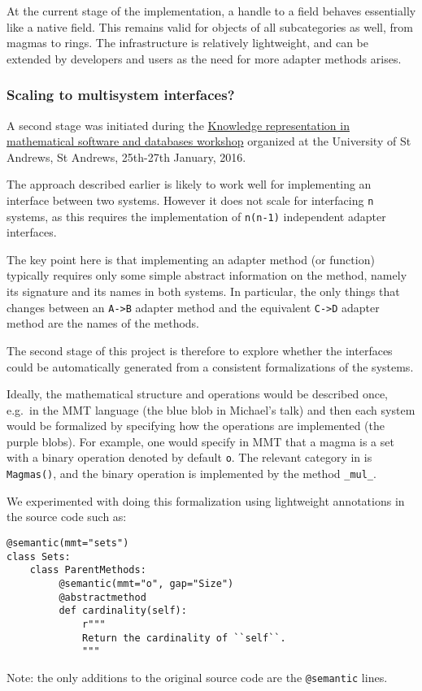 At the current stage of the implementation, a handle to a \GAP field
behaves essentially like a native \Sage field. This remains valid for
objects of all subcategories as well, from magmas to rings. The
infrastructure is relatively lightweight, and can be extended by
developers and users as the need for more adapter methods arises.

\subsubsection{Scaling to multisystem interfaces?}\label{scaling-to-multisystem-interfaces}

A second stage was initiated during the
\href{http://opendreamkit.org/2015/12/08/WP6StAndrewsMeeting/}{Knowledge
representation in mathematical software and databases workshop}
organized at the University of St Andrews, St Andrews, 25th-27th
January, 2016.

The approach described earlier is likely to work well for implementing
an interface between two systems. However it does not scale for
interfacing \texttt{n} systems, as this requires the implementation of
\texttt{n(n-1)} independent adapter interfaces.

The key point here is that implementing an adapter method (or
function) typically requires only some simple abstract information on
the method, namely its signature and its names in both systems.  In
particular, the only things that changes between an \texttt{A->B}
adapter method and the equivalent \texttt{C->D} adapter method are the
names of the methods.

The second stage of this project is therefore to explore whether the
interfaces could be automatically generated from a consistent
formalizations of the systems.


Ideally, the mathematical structure and operations would be described
once, e.g.~in the MMT language (the blue blob in Michael's talk) and
then each system would be formalized by specifying how the operations
are implemented (the purple blobs). For example, one would specify in
MMT that a magma is a set with a binary operation denoted by default
\texttt{o}. The relevant category in \Sage is \texttt{Magmas()}, and
the binary operation is implemented by the method \texttt{\_mul\_}.

We experimented with doing this formalization using lightweight
annotations in the \Sage source code such as:
\begin{lstlisting}
@semantic(mmt="sets")
class Sets:
    class ParentMethods:
         @semantic(mmt="o", gap="Size")
         @abstractmethod
         def cardinality(self):
             r"""
             Return the cardinality of ``self``.
             """
\end{lstlisting}
Note: the only additions to the original source code are the \texttt{@semantic} lines.

